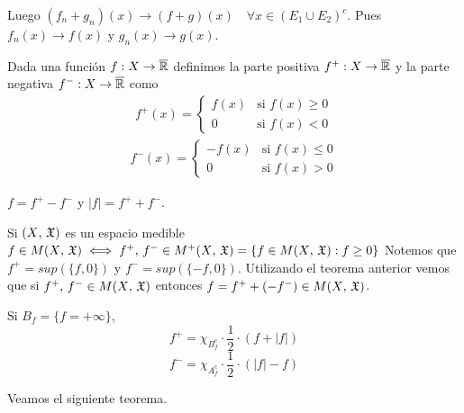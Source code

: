Luego $(f_n + g_n)(x) \to (f+g)(x) \quad \forall x \in (E_1 \cup E_2)^c$. Pues $f_n(x) \to f(x)$ y $g_n(x) \to g(x)$.

\clearpage

\begin{definition}
    Dada una función $f : X \to \overline{\mathbb{R}}$ definimos la parte positiva $f^{+} : X \to \overline{\mathbb{R}}$ y la parte negativa $f^{-} : X \to \overline{\mathbb{R}}$ como
    \begin{align*}
        f^{+}(x) = \begin{cases}
                       f(x) & \text{si } f(x) \geq 0 \\
                       0    & \text{si } f(x) < 0
                   \end{cases}
    \end{align*}
    \begin{align*}
        f^{-}(x) = \begin{cases}
                       -f(x) & \text{si } f(x) \leq 0 \\
                       0     & \text{si } f(x) > 0
                   \end{cases}
    \end{align*}
\end{definition}

\begin{note}
    $f = f^{+} - f^{-}$ y $|f| = f^{+} + f^{-}$.
\end{note}

\begin{note}
    Si $(X \text{, } \mathfrak{X})$ es un espacio medible $f \in M(X\text{, } \mathfrak{X}) \iff f^{+} \text{, } f^{-} \in M^{+}(X\text{, } \mathfrak{X}) = \{ f \in M(X\text{, } \mathfrak{X}) : f \geq 0 \}$
    Notemos que $f^{+} = sup(\{ f, 0 \})$ y $f^{-} = sup(\{ -f, 0 \})$.
    Utilizando el teorema anterior vemos que si $f^{+} \text{, } f^{-} \in M(X\text{, } \mathfrak{X})$ entonces $f = f^{+} + (-f^{-}) \in M(X\text{, } \mathfrak{X})$.
\end{note}

\begin{note}
    Si $B_f = \{ f = +\infty \}$,
    \[ f^+ = \chi_{B_f^c} \cdot \frac{1}{2} \cdot (f + |f|) \]
    \[ f^- = \chi_{A_f^c} \cdot \frac{1}{2} \cdot (|f| - f) \]
\end{note}

\clearpage

Veamos el siguiente teorema.

